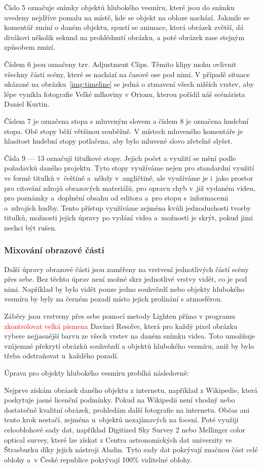 \documentclass[12pt,a4paper,titlepage]{article}
\begin{document}
Číslo 5 označuje snímky objektů hlubokého vesmíru, které jsou do snímku uvedeny nejdříve pomalu na místě, kde se objekt na obloze nachází. Jakmile se komentář zmíní o daném objektu, spustí se animace, která obrázek zvětší, dá divákovi několik sekund na prohlédnutí obrázku, a poté obrázek zase stejným způsobem zmizí.

Číslem 6 jsou označeny tzv. Adjustment Clips. Těmito klipy mohu ovlivnit všechny části scény, které se nachází na časové ose pod nimi. V případě situace ukázané na obrázku~\ref{img:timeline} se jedná o ztmavení všech nižších vrstev, aby lépe vynikla fotografie Velké mlhoviny v Orionu, kterou pořídil náš scénárista Daniel Kurtin.

Číslem 7 je označena stopa s mluveným slovem a číslem 8 je označena hudební stopa. Obě stopy běží většinou souběžně. V místech mluveného komentáře je hlasitost hudební stopy potlačena, aby bylo mluvené slovo zřetelně slyšet.

Čísla 9 --- 13 označují titulkové stopy. Jejich počet a využití se mění podle požadavků daného projektu. Tyto stopy využíváme nejen pro standardní využití ve formě titulků v~češtině a~někdy v~angličtině, ale využíváme je i~jako prostor pro citování zdrojů obrazových materiálů, pro opravu chyb v~již vydaném videu, pro poznámky a~doplnění obsahu od editora a~pro stopu s~informacemi o~zdrojích hudby. Tento přístup využíváme zejména kvůli jednoduchosti tvorby titulků, možnosti jejich úpravy po vydání videa a~možnosti je skrýt, pokud jimi nechci být rušen. 
\subsubsection{Mixování obrazové části}
Další úpravy obrazové části jsou zaměřeny na vrstvení jednotlivých částí scény přes sebe. Bez těchto úprav není možné skrz jednotlivé vrstvy vidět, co je pod nimi. Například by bylo vidět pouze jedno souhvězdí nebo objekty hlubokého vesmíru by byly na černém pozadí místo jejich prolínání s atmosférou.

Záběry jsou vrstveny přes sebe pomocí metody Lighten přímo v programu \textcolor{red}{zkontrolovat velká písmena} Davinci Resolve, která pro každý pixel obrázku vybere nejjasnější barvu ze všech vrstev na daném snímku videa. Toto umožňuje vzájemné překrytí obrázků souhvězdí a objektů hlubokého vesmíru, aniž by bylo třeba odstraňovat u~každého pozadí. 

Úprava pro objekty hlubokého vesmíru probíhá následovně:

Nejprve získám obrázek daného objektu z internetu, například z Wikipedie, která poskytuje jasné licenční podmínky. Pokud na Wikipedii není vhodný nebo dostatečně kvalitní obrázek, prohledám další fotografie na internetu. Občas ani tento krok nestačí, zejména u~objektů nezajímavých na focení. Poté využiji celooblohové sady dat, například Digitized Sky Survey 2 nebo Mellinger color optical survey, které lze získat z Centra astronomických dat univerzity ve Štrasburku díky jejich nástroji Aladin. Tyto sady dat pokrývají značnou část celé oblohy a~v České republice pokrývají 100\% viditelné oblohy. 
\end{document}
